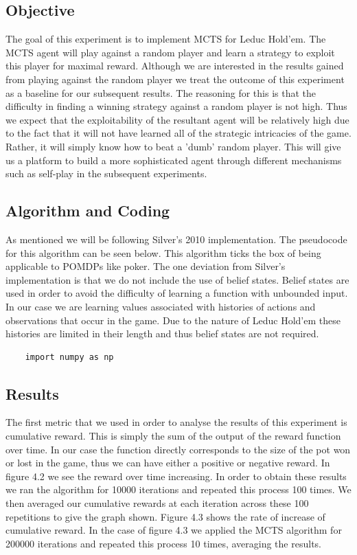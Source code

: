 \subsection{Objective}\label{subsec:objective1}
The goal of this experiment is to implement MCTS for Leduc Hold'em.
The MCTS agent will play against a random player and learn a strategy to exploit this player for
maximal reward.
Although we are interested in the results gained from playing against the random player we treat the
outcome of this experiment as a baseline for our subsequent results.
The reasoning for this is that the difficulty in finding a winning strategy against a random player
is not high.
Thus we expect that the exploitability of the resultant agent will be relatively high due to the
fact that it will not have learned all of the strategic intricacies of the game.
Rather, it will simply know how to beat a 'dumb' random player.
This will give us a platform to build a more sophisticated agent through different mechanisms such as
self-play in the subsequent experiments.

\subsection{Algorithm and Coding}\label{subsec:algAndCoding1}
As mentioned we will be following Silver's 2010 implementation.
The pseudocode for this algorithm can be seen below.
This algorithm ticks the box of being applicable to POMDPs like poker.
The one deviation from Silver's implementation is that we do not include the use of belief states.
Belief states are used in order to avoid the difficulty of learning a function with unbounded
input\citep{thrun2000monte}.
In our case we are learning values associated with histories of actions and observations that occur in the game.
Due to the nature of Leduc Hold'em these histories are limited in their length and thus belief states are
not required.

\lstset{language=Python}
\lstset{frame=lines}
\lstset{basicstyle=\footnotesize}
\begin{lstlisting}
    import numpy as np
\end{lstlisting}

\subsection{Results}\label{subsec:results1}
The first metric that we used in order to analyse the results of this experiment is cumulative reward.
This is simply the sum of the output of the reward function over time.
In our case the function directly corresponds to the size of the pot won or lost in the game,
thus we can have either a positive or negative reward.
In figure 4.2 we see the reward over time increasing.
In order to obtain these results we ran the algorithm for 10000 iterations and repeated this process 100 times.
We then averaged our cumulative rewards at each iteration across these 100 repetitions to give the graph shown.
Figure 4.3 shows the rate of increase of cumulative reward.
In the case of figure 4.3 we applied the MCTS algorithm for 200000 iterations and
repeated this process 10 times, averaging the results.


